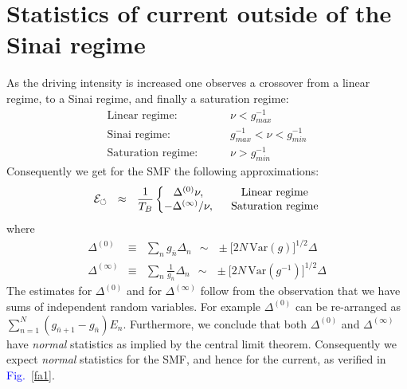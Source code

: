 \documentclass[aps,pre,floats,floatfix,twocolumn]{revtex4}
\newcommand{\amatrix}[1]{\begin{matrix} #1 \end{matrix}}
\newcommand{\mylabel}[1]{\label{#1}}
\newcommand{\beq}{\begin{eqnarray}}
\newcommand{\eeq}{\end{eqnarray}}
\newcommand{\be}[1]{\begin{eqnarray}\ifthenelse{#1=-1}
{\nonumber}{\ifthenelse{#1=0}{}{\mylabel{e#1}}}}
\newcommand{\Fig}[1]{\textcolor{blue}{Fig.}\!\!~\ref{#1}}
\begin{document}
\section{Statistics of current outside of the Sinai regime}
\label{sec:out}

As the driving intensity is increased one observes a crossover from 
a linear regime, to a Sinai regime, and finally a saturation regime: 
% 
\beq
\text{Linear regime:}     & \ \ \ \ \ & \ \nu < g_{max}^{-1} \\
\text{Sinai regime:}      &&  \ g_{max}^{-1} < \nu < g_{min}^{-1}\\
\text{Saturation regime:} && \ \nu > g_{min}^{-1}
\eeq
%
Consequently we get for the SMF the following approximations: 
%
\be{131}
\mathcal{E}_{\circlearrowleft} \ \ \approx \ \ 
\frac{1}{T_B}
\left\{
\amatrix{
\Delta^{(0)}\nu, & \ \ \text{Linear regime} \cr 
-\Delta^{(\infty)}/\nu , & \ \ \text{Saturation regime}
}\right.
\eeq
%
where 
%
\beq
\Delta^{(0)} &\equiv&  \sum_{n} g_{\bar{n}}  \Delta_n 
\ \ \sim  \ \ \pm \Big[2N \, \mbox{Var}(g)\Big]^{1/2} \Delta
\\
\Delta^{(\infty)} &\equiv& \sum_{n} \frac{1}{g_{\bar{n}}}  \Delta_n
\ \ \sim \ \ \pm \Big[2N \, \mbox{Var}(g^{-1})\Big]^{1/2} \Delta
\eeq
%
The estimates for $\Delta^{(0)}$ and for $\Delta^{(\infty)}$
follow from the observation that we have sums of independent 
random variables. For example $\Delta^{(0)}$ can be re-arranged 
as ${\sum_{n=1}^{N} (g_{\bar{n}+1}-g_{\bar{n}}) E_n}$.
Furthermore, we conclude that both $\Delta^{(0)} $ and $\Delta^{(\infty)}$
have {\em normal} statistics as implied by the 
central limit theorem. Consequently we expect {\em normal} statistics 
for the SMF, and hence for the current, as verified in \Fig{fa1}.
\end{document}
